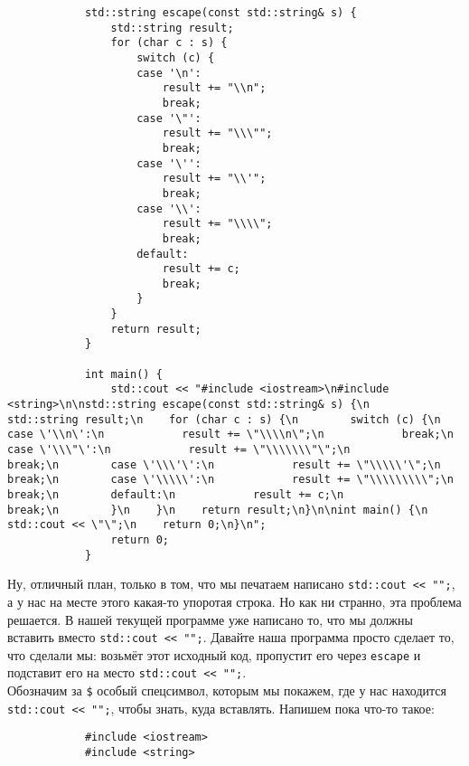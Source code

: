 \documentclass{article}
\begin{document}
\begin{remark}
\begin{verbatim}
            std::string escape(const std::string& s) {
                std::string result;
                for (char c : s) {
                    switch (c) {
                    case '\n':
                        result += "\\n";
                        break;
                    case '\"':
                        result += "\\\"";
                        break;
                    case '\'':
                        result += "\\'";
                        break;
                    case '\\':
                        result += "\\\\";
                        break;
                    default:
                        result += c;
                        break;
                    }
                }
                return result;
            }

            int main() {
                std::cout << "#include <iostream>\n#include <string>\n\nstd::string escape(const std::string& s) {\n    std::string result;\n    for (char c : s) {\n        switch (c) {\n        case \'\\n\':\n            result += \"\\\\n\";\n            break;\n        case \'\\\"\':\n            result += \"\\\\\\\"\";\n            break;\n        case \'\\\'\':\n            result += \"\\\\\'\";\n            break;\n        case \'\\\\\':\n            result += \"\\\\\\\\\";\n            break;\n        default:\n            result += c;\n            break;\n        }\n    }\n    return result;\n}\n\nint main() {\n    std::cout << \"\";\n    return 0;\n}\n";
                return 0;
            }
        \end{verbatim}
        Ну, отличный план, только в том, что мы печатаем написано \Verb|std::cout << "";|, а у нас на месте этого какая-то упоротая строка. Но как ни странно, эта проблема решается. В нашей текущей программе уже написано то, что мы должны вставить вместо \Verb|std::cout << "";|. Давайте наша программа просто сделает то, что сделали мы: возьмёт этот исходный код, пропустит его через \Verb|escape| и подставит его на место \Verb|std::cout << "";|.\\
        Обозначим за \Verb|$| особый спецсимвол, которым мы покажем, где у нас находится \Verb|std::cout << "";|, чтобы знать, куда вставлять. Напишем пока что-то такое:
        \begin{verbatim}
            #include <iostream>
            #include <string>
            

\end{verbatim}
\end{remark}
\end{document}
